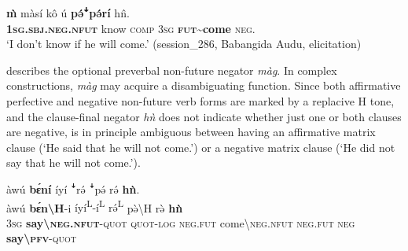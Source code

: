 \documentclass[output=paper,colorlinks,citecolor=brown]{langscibook}
\begin{document}
\ea\label{ex:kam:78} 
    \gll \textbf{\`{m}} màsí kô ú \textbf{pə́ꜜpə́rí} h\^{n}.\\
        \textbf{\textsc{1sg}}\textbf{.\textsc{sbj}}\textbf{.\textsc{neg}}\textbf{.\textsc{nfut}} know \textsc{comp} \textsc{3sg} \textbf{\textsc{fut}}\textbf{{\textasciitilde}come} \textsc{neg}.\\
    \glt ‘I don’t know if he will come.’  (session\_286, Babangida Audu, elicitation)
\z 

 describes the optional preverbal non-future negator \textit{màg}. In complex constructions, \textit{màg} may acquire a disambiguating function. Since both affirmative perfective and negative non-future verb forms are marked by a replacive H tone, and the clause-final negator \textit{hǹ} does not indicate whether just one or both clauses are negative,  is in principle ambiguous between having an affirmative matrix clause (‘He said that he will not come.’) or a negative matrix clause (‘He did not say that he will not come.’).



\ea\label{ex:kam:79} 
   \gllll \small{àwú} \small{\textbf{bɛ́ní}} \small{íyí} \small{ꜜrə́} \small{ꜜpə́} \small{rə́} \small{\textbf{hǹ}}. \\
        \small{àwú} \small{\textbf{bɛ́n{\textbackslash}H}{}-i} \small{íyí\textsuperscript{L}{}-í\textsuperscript{L}} \small{rə́\textsuperscript{L}} \small{pə̀{\textbackslash}H} \small{rə̀} \small{\textbf{hǹ}} \\
       \small{\textsc{3sg}} \small{{\textbf{say{\textbackslash}}\textbf{\textsc{neg}}\textbf{.\textsc{nfut}}{}-\textsc{quot}}} \small{\textsc{quot}{}-\textsc{log}} \small{\textsc{neg}.\textsc{fut}} \small{come{\textbackslash}\textsc{neg}.\textsc{nfut}} \small{\textsc{neg}.\textsc{fut}} \small{\textsc{neg}} \\ 
        {} \small{{\textbf{say{\textbackslash}}\textbf{\textsc{pfv}}{}-\textsc{quot}}} {} {} {} {} {}\\ 
\end{document}
